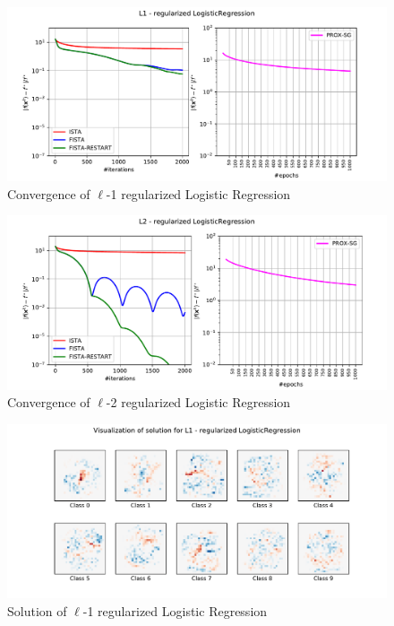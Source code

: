 \documentclass[12pt]{article}
\begin{document}
\begin{figure}
    \centering
    \includegraphics[width=17cm]{hw3/codes/exercise1/results/l1.pdf}
    \caption{Convergence of $\ell$-1 regularized Logistic Regression}
    \label{fig:l1-convergence}
\end{figure}

\begin{figure}
    \centering
    \includegraphics[width=17cm]{hw3/codes/exercise1/results/l2.pdf}
    \caption{Convergence of $\ell$-2 regularized Logistic Regression}
    \label{fig:l2-convergence}
\end{figure}

\begin{figure}
    \centering
    \includegraphics[width=17cm]{hw3/codes/exercise1/results/l1-numbers.pdf}
    \caption{Solution of $\ell$-1 regularized Logistic Regression}
    \label{fig:l1-solution}
\end{figure}
\end{document}
